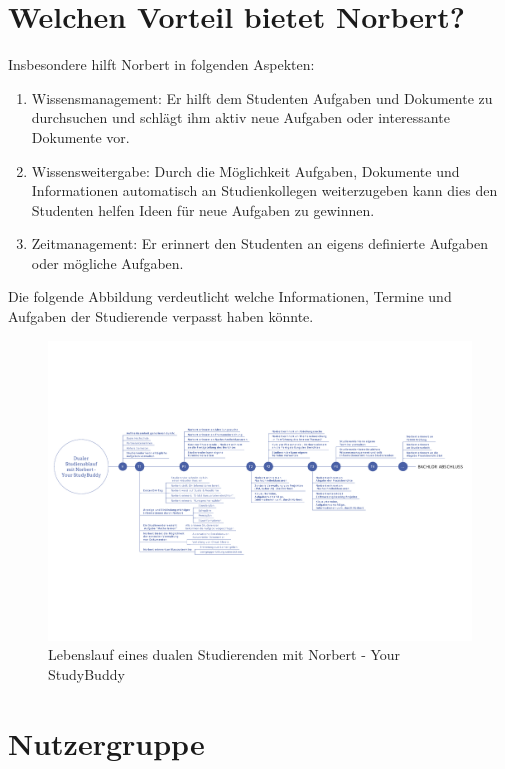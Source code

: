 \section{Welchen Vorteil bietet Norbert?}
Insbesondere hilft Norbert in folgenden Aspekten:
\begin{enumerate}
	\item Wissensmanagement: Er hilft dem Studenten Aufgaben und Dokumente zu durchsuchen und schlägt ihm aktiv neue Aufgaben oder interessante Dokumente vor.
	\item Wissensweitergabe: Durch die Möglichkeit Aufgaben, Dokumente und Informationen automatisch an Studienkollegen weiterzugeben kann dies den Studenten helfen Ideen für neue Aufgaben zu gewinnen.
	\item Zeitmanagement: Er erinnert den Studenten an eigens definierte Aufgaben oder mögliche Aufgaben.
\end{enumerate}

Die folgende Abbildung verdeutlicht welche Informationen, Termine und Aufgaben der Studierende verpasst haben könnte. 

\begin{landscape}
\vspace*{35mm}
	\begin{figure}[H]
	\centering
	\includegraphics[scale=0.75]{images/timeline.pdf}
	\caption{Lebenslauf eines dualen Studierenden mit Norbert - Your StudyBuddy}
	\end{figure}
	
\end{landscape}
\newpage

\section{Nutzergruppe}


